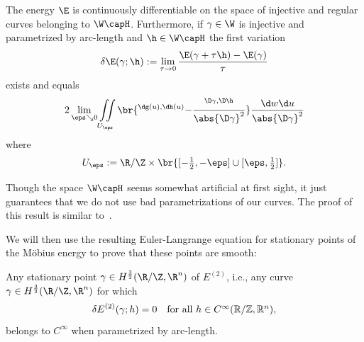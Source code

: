 \begin{theorem} \label{thm:EulerLagrangeEquation}
 The energy $\E$ is continuously differentiable on the space of injective and regular
 curves belonging to $\W\capH$. Furthermore, if
 $\g\in\W$ is injective and parametrized by arc-length
 and $\h\in \W\capH$
   the first variation \[ \delta\E(\g;\h) := \lim_{\tau\to0}\frac{\E(\g+\tau\h)-\E(\g)}\tau \]
   exists and equals
   \[%
     2\lim_{\eps\searrow0} \iint\limits_{U_\eps}
     \br{\sp{\dg(u),\dh(u)}-\frac{\sp{\D\g,\D\h}}{\abs{\D\g}^2}} %
     \frac{\d w\d u}{\abs{\D\g}^2}
   \]%
   where
   \begin{equation}\label{eq:Ue}
     U_\eps := \R/\Z\times\br{[-\tfrac12,-\eps]\cup[\eps,\tfrac12]}.
   \end{equation}
\end{theorem}

Though the space $\W\capH$ seems somewhat artificial at first sight, it just guarantees that 
we do not use bad parametrizations of our curves. The proof of this 
result is similar to~\cite{BlattReiterStationary11}.

We will then use the resulting Euler-Langrange equation for stationary points of the M\"obius energy to
prove that these points are smooth:

\begin{theorem} \label{thm:MainResult}
Any stationary point $\soln \in H^{\frac 3 2}(\R / \Z, \R^n)$ of $E^{(2)}$, i.e., any curve
$\soln \in H^{\frac 3 2 }(\R / \Z, \R^n)$ for which
\begin{equation*}
 \delta E^{(2)} ({\gamma};h) =0 \quad \mbox{for all $h \in C^{\infty}(\mathbb R / \mathbb Z, \mathbb R^n)$},
\end{equation*}
belongs to $C^\infty$ when parametrized by arc-length.
\end{theorem}

